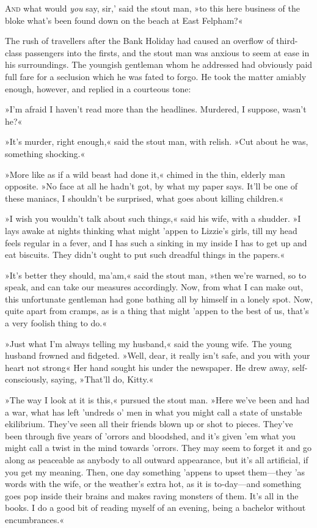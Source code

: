 
\lettrine[lines=4,ante=‘]{A}{nd} what would \textit{you} say, sir,' said the stout man, »to this here business of the bloke what's been found down on the beach at East Felpham?«

\zz
The rush of travellers after the Bank Holiday had caused an overflow of third-class passengers into the firsts, and the stout man was anxious to seem at ease in his surroundings. The youngish gentleman whom he addressed had obviously paid full fare for a seclusion which he was fated to forgo. He took the matter amiably enough, however, and replied in a courteous tone:

»I'm afraid I haven't read more than the headlines. Murdered, I suppose, wasn't he?«

»It's murder, right enough,« said the stout man, with relish. »Cut about he was, something shocking.«

»More like as if a wild beast had done it,« chimed in the thin, elderly man opposite. »No face at all he hadn't got, by what my paper says. It'll be one of these maniacs, I shouldn't be surprised, what goes about killing children.«

»I wish you wouldn't talk about such things,« said his wife, with a shudder. »I lays awake at nights thinking what might 'appen to Lizzie's girls, till my head feels regular in a fever, and I has such a sinking in my inside I has to get up and eat biscuits. They didn't ought to put such dreadful things in the papers.«

»It's better they should, ma'am,« said the stout man, »then we're warned, so to speak, and can take our measures accordingly. Now, from what I can make out, this unfortunate gentleman had gone bathing all by himself in a lonely spot. Now, quite apart from cramps, as is a thing that might 'appen to the best of us, that's a very foolish thing to do.«

»Just what I'm always telling my husband,« said the young wife. The young husband frowned and fidgeted. »Well, dear, it really isn't safe, and you with your heart not strong\longdash« Her hand sought his under the newspaper. He drew away, self-consciously, saying, »That'll do, Kitty.«

»The way I look at it is this,« pursued the stout man. »Here we've been and had a war, what has left 'undreds o' men in what you might call a state of unstable ekilibrium. They've seen all their friends blown up or shot to pieces. They've been through five years of 'orrors and bloodshed, and it's given 'em what you might call a twist in the mind towards 'orrors. They may seem to forget it and go along as peaceable as anybody to all outward appearance, but it's all artificial, if you get my meaning. Then, one day something 'appens to upset them—they 'as words with the wife, or the weather's extra hot, as it is to-day—and something goes pop inside their brains and makes raving monsters of them. It's all in the books. I do a good bit of reading myself of an evening, being a bachelor without encumbrances.«


